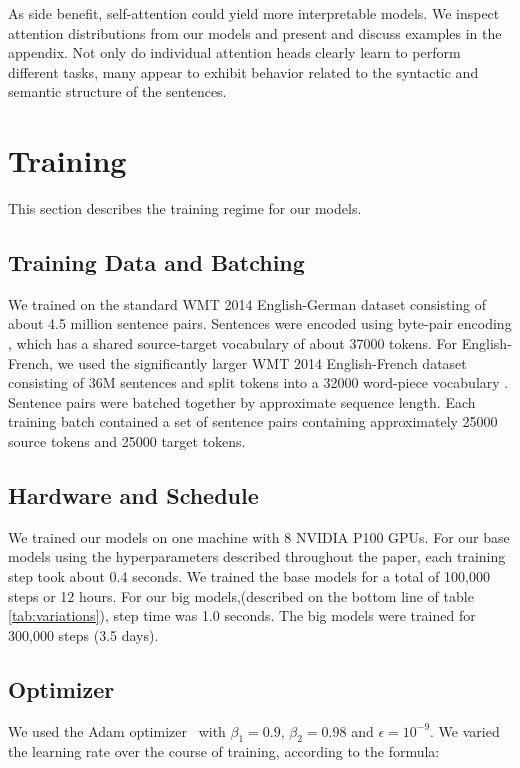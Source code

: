 \documentclass{article}
\begin{document}
As side benefit, self-attention could yield more interpretable models. We inspect attention distributions from our models and present and discuss examples in the appendix. Not only do individual attention heads clearly learn to perform different tasks, many appear to exhibit behavior related to the syntactic and semantic structure of the sentences.




\section{Training}

This section describes the training regime for our models. 


\subsection{Training Data and Batching}
We trained on the standard WMT 2014 English-German dataset consisting of about 4.5 million sentence pairs.  Sentences were encoded using byte-pair encoding \citep{DBLP:journals/corr/BritzGLL17}, which has a shared source-target vocabulary of about 37000 tokens. For English-French, we used the significantly larger WMT 2014 English-French dataset consisting of 36M sentences and split tokens into a 32000 word-piece vocabulary \citep{wu2016google}.  Sentence pairs were batched together by approximate sequence length.  Each training batch contained a set of sentence pairs containing approximately 25000 source tokens and 25000 target tokens.  

\subsection{Hardware and Schedule}

We trained our models on one machine with 8 NVIDIA P100 GPUs.  For our base models using the hyperparameters described throughout the paper, each training step took about 0.4 seconds.  We trained the base models for a total of 100,000 steps or 12 hours.  For our big models,(described on the bottom line of table \ref{tab:variations}), step time was 1.0 seconds.  The big models were trained for 300,000 steps (3.5 days).

\subsection{Optimizer} We used the Adam optimizer~\citep{kingma2014adam} with $\beta_1=0.9$, $\beta_2=0.98$ and $\epsilon=10^{-9}$.  We varied the learning rate over the course of training, according to the formula:
\end{document}
